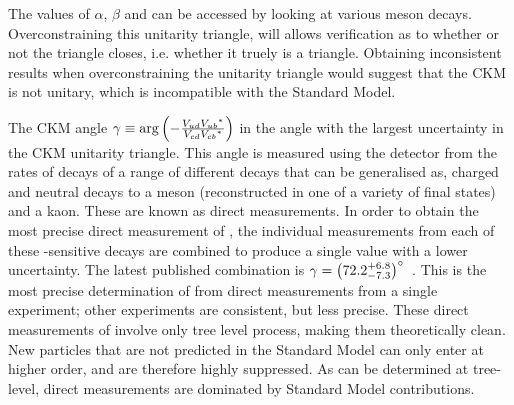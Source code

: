 The values of $\alpha$, $\beta$ and \Pgamma can be accessed by looking at various \B meson decays. Overconstraining this unitarity triangle, will allows verification as to whether or not the triangle closes, i.e. whether it truely is a triangle. Obtaining inconsistent results when overconstraining the unitarity triangle would suggest that the CKM is not unitary, which is incompatible with the Standard Model. 

The CKM angle $\gamma \equiv \arg\left(-\frac{{V_{{u}{d}}}{{V_{{u}{b}}}}^*}{{V_{{c}{d}}}{{V_{{c}{b}}}}^*}\right)$ in the angle with the largest uncertainty in the CKM unitarity triangle. This angle is measured using the \lhcb detector from the rates of decays of a range of different decays that can be generalised as, charged and neutral \B decays to a \D meson (reconstructed in one of a variety of final states) and a kaon. These are known as direct measurements. In order to obtain the most precise direct measurement of \Pgamma, the individual measurements from each of these \Pgamma-sensitive decays are combined to produce a single value with a lower uncertainty. The latest published \lhcb combination is $\gamma = \left(72.2^{+6.8}_{-7.3}\right)^{\circ}$~\cite{LHCb-PAPER-2016-032}. This is the most precise determination of \Pgamma from direct measurements from a single experiment; other experiments are consistent, but less precise. These direct measurements of \Pgamma involve only tree level process, making them theoretically clean. New particles that are not predicted in the Standard Model can only enter at higher order, and are therefore highly suppressed. As \Pgamma can be determined at tree-level, direct measurements are dominated by Standard Model contributions.

